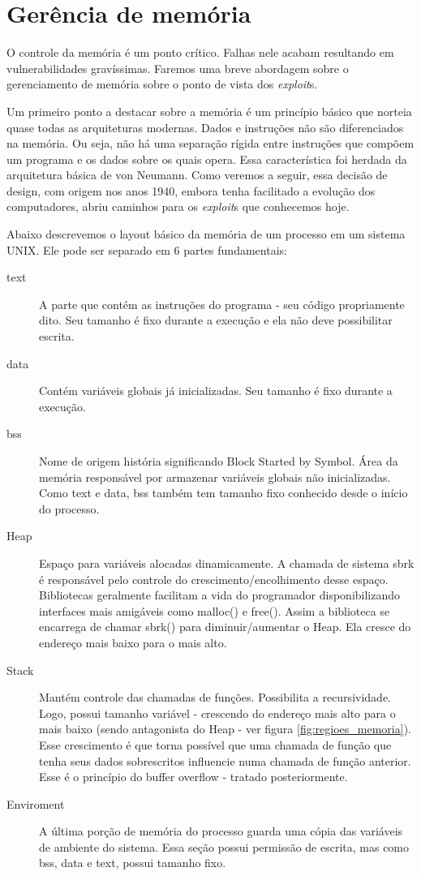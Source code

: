 	\section{Gerência de memória}
	O controle da memória é um ponto crítico. Falhas nele acabam resultando em vulnerabilidades 
	gravíssimas. Faremos uma breve abordagem sobre o gerenciamento de memória sobre
	o ponto de vista dos \textsl{exploit}s.

	Um primeiro ponto a destacar sobre a memória é um princípio básico que norteia
	quase todas as arquiteturas modernas. Dados e instruções não são diferenciados na memória.
	Ou seja, não há uma separação rígida entre instruções que compõem um programa e os dados
	sobre os quais opera. Essa característica foi herdada da arquitetura básica de von Neumann.
	Como veremos a seguir, essa decisão de design, com origem nos anos 1940, embora tenha
	facilitado a evolução dos computadores, abriu caminhos para os \textsl{exploit}s que conhecemos hoje. 

	Abaixo descrevemos o layout básico da memória de um processo em um sistema UNIX.
	Ele pode ser separado em 6 partes fundamentais:
	\begin{description}
		\item[text]
			A parte que contém as instruções do programa - seu código propriamente dito.
			Seu tamanho é fixo durante a execução e ela não deve possibilitar escrita.
		\item[data]
			Contém variáveis globais já inicializadas. Seu tamanho é fixo durante a execução.
		\item[bss]
			Nome de origem história significando Block Started by Symbol. Área da memória responsável
			por armazenar variáveis globais	não inicializadas. Como text e data, bss também tem tamanho 
			fixo conhecido desde o início do processo. 
		\item[Heap]
			Espaço para variáveis alocadas dinamicamente. A chamada de sistema sbrk é responsável
			pelo controle do crescimento/encolhimento desse espaço. Bibliotecas geralmente facilitam a vida
			do programador disponibilizando interfaces mais amigáveis como malloc() e free(). Assim a biblioteca
			se encarrega de chamar sbrk() para diminuir/aumentar o Heap. Ela cresce do endereço mais baixo para o
			mais alto.
		\item[Stack]
			Mantém controle das chamadas de funções. Possibilita a recursividade. Logo, possui
			tamanho variável - crescendo do endereço mais alto para o mais baixo (sendo antagonista do Heap - ver
			figura \ref{fig:regioes_memoria}). 
			Esse crescimento é que torna possível que uma chamada de função que tenha seus dados
			sobrescritos influencie numa chamada de função anterior. Esse é o princípio do buffer overflow - tratado
			posteriormente.
		\item[Enviroment]
			A última porção de memória do processo guarda uma cópia das variáveis de ambiente do sistema.
			Essa seção possui permissão de escrita, mas como bss, data e text, possui tamanho fixo.
	\end{description}


